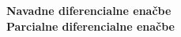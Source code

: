 \newcommand{\ksldiffeqnaslov}[1]{\newpage \textbf{\Huge #1} \vspace{2cm} \\}

\ksldiffeqnaslov{Navadne diferencialne enačbe}


\ksldiffeqnaslov{Parcialne diferencialne enačbe}
